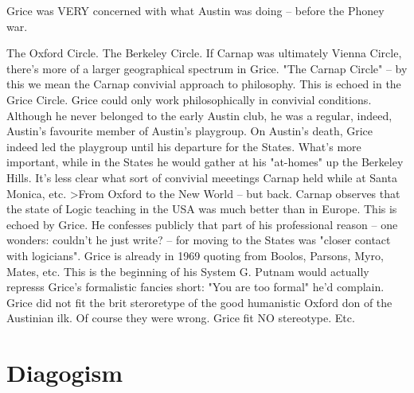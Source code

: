 \documentclass[10pt,titlepage]{book}
\begin{document}
{Grice was VERY  concerned with  what Austin was doing -- before the Phoney war.

The  Oxford Circle. The Berkeley Circle. If Carnap was ultimately Vienna Circle,  there’s more of a larger geographical spectrum in Grice.
"The Carnap Circle" --  by this we mean the Carnap convivial approach to philosophy. 
This is echoed in  the Grice Circle.
Grice could only work philosophically in convivial conditions.
Although he never belonged to the early Austin club, 
he was a regular, indeed,  Austin's favourite member of Austin's playgroup. 
On Austin's death, Grice indeed led the playgroup until his departure for 
the States. What's more important,  while in the States he would gather at his 
"at-homes" up the Berkeley Hills.  It's less clear what sort of convivial 
meeetings Carnap held while at Santa  Monica, etc. 
>From  Oxford to the New World – but back. Carnap  observes that the state 
of Logic teaching in  the USA was much better than  in Europe. This is echoed 
by Grice. He confesses publicly that part of his  professional reason -- 
one wonders:  couldn't he just write? -- for moving  to the States was "closer 
contact 
with  logicians". Grice is already in  1969 quoting from Boolos, Parsons, 
Myro, Mates, etc.  This is the beginning  of his System G. Putnam would 
actually represss Grice's formalistic fancies  short: "You are too formal" he'd 
complain. Grice did not fit  the brit  steroretype of the good humanistic 
Oxford don of the 
Austinian ilk. Of   course they were wrong. Grice fit NO stereotype. Etc.

\section{Diagogism}

}
\end{document}
